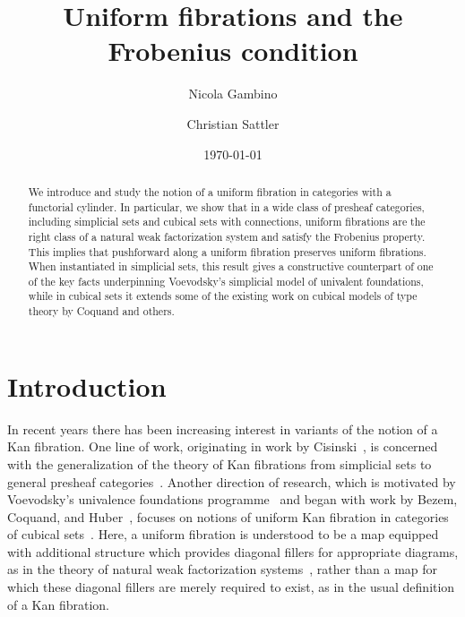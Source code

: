 \documentclass[reqno,10pt,a4paper,oneside,draft]{amsart}
\title{Uniform fibrations and the Frobenius condition}
\begin{document}
\begin{abstract}
We introduce and study the notion of a uniform fibration in categories with a functorial cylinder.
In particular, we show that in a wide class of presheaf categories, including simplicial sets and cubical sets with connections, uniform fibrations are the right class of a natural weak factorization system and satisfy the Frobenius property.
This implies that pushforward along a uniform fibration preserves uniform fibrations.
When instantiated in simplicial sets, this result gives a constructive counterpart of one of the key facts underpinning Voevodsky's simplicial model of univalent foundations, while in cubical sets it extends some of the existing work on cubical models of type theory by Coquand and others.
\end{abstract}

\author{Nicola Gambino}
\address{School of Mathematics, University of Leeds, Leeds LS2 9JT, UK}

\author{Christian Sattler}
\address{School of Mathematics, University of Leeds, Leeds LS2 9JT, UK}

\date{\today}

\maketitle


\section*{Introduction}

In recent years there has been increasing interest in variants of the notion of a Kan fibration.
One line of work, originating in work by Cisinski~\cite{cisinski-asterisque}, is concerned with the generalization of the theory of Kan fibrations from simplicial sets to general presheaf categories~\cite{cisinski-univalence,moerdijk-minimal}.
Another direction of research, which is motivated by Voevodsky's univalence foundations programme~\cite{voevodsky:uf} and began with work by Bezem, Coquand, and Huber~\cite{coquand-cubical-sets}, focuses on notions of uniform Kan fibration in categories of cubical sets~\cite{awodey-cubical,coquand-variation,huber-thesis,pitts-cubical-nominal,swan-awfs}.
Here, a uniform fibration is understood to be a map equipped with additional structure which provides diagonal fillers for appropriate diagrams, as in the theory of natural weak factorization systems~\cite{grandis-tholen-nwfs}, rather than a map for which these diagonal fillers are merely required to exist, as in the usual definition of a Kan fibration.
\end{document}
